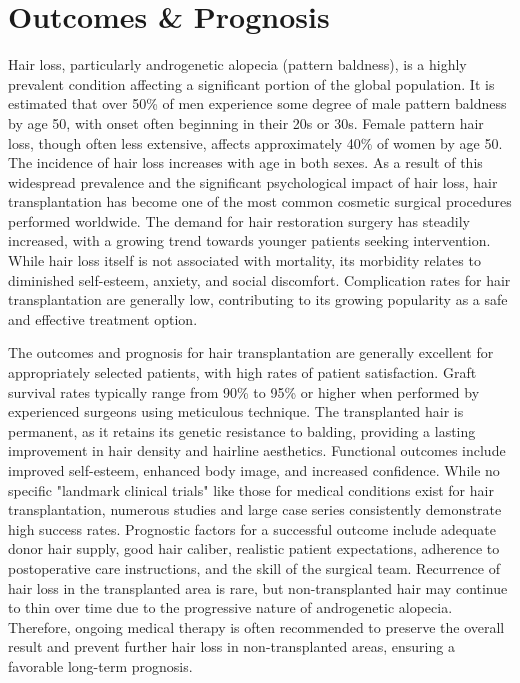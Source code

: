 \section*{Outcomes \& Prognosis}
Hair loss, particularly androgenetic alopecia (pattern baldness), is a highly prevalent condition affecting a significant portion of the global population. It is estimated that over 50\% of men experience some degree of male pattern baldness by age 50, with onset often beginning in their 20s or 30s. Female pattern hair loss, though often less extensive, affects approximately 40\% of women by age 50. The incidence of hair loss increases with age in both sexes. As a result of this widespread prevalence and the significant psychological impact of hair loss, hair transplantation has become one of the most common cosmetic surgical procedures performed worldwide. The demand for hair restoration surgery has steadily increased, with a growing trend towards younger patients seeking intervention. While hair loss itself is not associated with mortality, its morbidity relates to diminished self-esteem, anxiety, and social discomfort. Complication rates for hair transplantation are generally low, contributing to its growing popularity as a safe and effective treatment option.

The outcomes and prognosis for hair transplantation are generally excellent for appropriately selected patients, with high rates of patient satisfaction. Graft survival rates typically range from 90\% to 95\% or higher when performed by experienced surgeons using meticulous technique. The transplanted hair is permanent, as it retains its genetic resistance to balding, providing a lasting improvement in hair density and hairline aesthetics. Functional outcomes include improved self-esteem, enhanced body image, and increased confidence. While no specific "landmark clinical trials" like those for medical conditions exist for hair transplantation, numerous studies and large case series consistently demonstrate high success rates. Prognostic factors for a successful outcome include adequate donor hair supply, good hair caliber, realistic patient expectations, adherence to postoperative care instructions, and the skill of the surgical team. Recurrence of hair loss in the transplanted area is rare, but non-transplanted hair may continue to thin over time due to the progressive nature of androgenetic alopecia. Therefore, ongoing medical therapy is often recommended to preserve the overall result and prevent further hair loss in non-transplanted areas, ensuring a favorable long-term prognosis.

